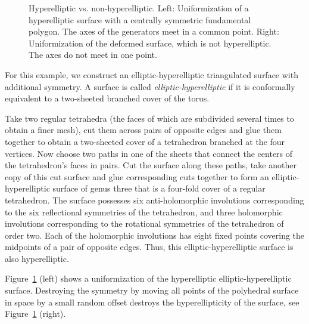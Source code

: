 \documentclass[Thesis]{subfiles}
\begin{document}
\begin{figure}
\centering
{}
\caption{Hyperelliptic vs. non-hyperelliptic. Left: Uniformization of a
  hyperelliptic surface with a centrally symmetric fundamental
  polygon. The axes of the generators meet in a common point. Right:
  Uniformization of the deformed surface, which is not hyperelliptic.
  The axes do not meet in one point.}
\label{fig:non-hyperelliptic}
\end{figure}

For this example, we construct an elliptic-hyperelliptic triangulated
surface with additional symmetry. A surface is called
\emph{elliptic-hyperelliptic} if it is conformally equivalent to a
two-sheeted branched cover of the torus.

Take two regular tetrahedra (the faces of which are subdivided several
times to obtain a finer mesh), cut them across pairs of opposite edges
and glue them together to obtain a two-sheeted cover of a tetrahedron
branched at the four vertices. Now choose two paths in one of the
sheets that connect the centers of the tetrahedron's faces in
pairs. Cut the surface along these paths, take another copy of this
cut surface and glue corresponding cuts together to form an
elliptic-hyperelliptic surface of genus three that is a four-fold
cover of a regular tetrahedron. The surface possesses six
anti-holomorphic involutions corresponding to the six reflectional
symmetries of the tetrahedron, and three holomorphic involutions
corresponding to the rotational symmetries of the tetrahedron of order
two. Each of the holomorphic involutions has eight fixed points
covering the midpoints of a pair of opposite edges. Thus, this
elliptic-hyperelliptic surface is also hyperelliptic.

Figure~\ref{fig:non-hyperelliptic} (left) shows a uniformization of
the hyperelliptic elliptic-hyperelliptic surface. Destroying the
symmetry by moving all points of the polyhedral surface in space by a
small random offset destroys the hyperellipticity of the surface, see
Figure~\ref{fig:non-hyperelliptic} (right).
\end{document}
